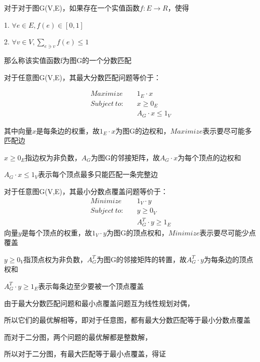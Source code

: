 \documentclass[UTF8]{ctexart}
\begin{document}
\begin{enumerate}
            \vspace{0.8cm}

            对于对于图G(V,E)，如果存在一个实值函数$f:E\to R$，使得

            1. $\forall e\in E,f(e)\in[0,1]$

            2. $\forall v\in V,\sum_{e\ni v}f(e)\le1$

            那么称该实值函数f为图G的一个分数匹配

            对于任意图G(V,E)，其最大分数匹配问题等价于：

            $$
                  \begin{aligned}
                        Maximize\quad     & 1_E\cdot x        \\
                        Subject\ to:\quad & x\ge0_E           \\
                                          & A_G\cdot x\le 1_V
                  \end{aligned}
            $$

            其中向量$x$是每条边的权重，故$1_E\cdot x$为图G的边权和，$Maximize$表示要尽可能多匹配边

            $x\ge0_E$指边权为非负数，$A_G$为图G的邻接矩阵，故$A_G\cdot x$为每个顶点的边权和

            $A_G\cdot x\le 1_V$表示每个顶点最多只能匹配一条完整边

            \vspace{0.8cm}

            对于任意图G(V,E)，其最小分数点覆盖问题等价于：
            $$
                  \begin{aligned}
                        Minimize\quad     & 1_V\cdot y          \\
                        Subject\ to:\quad & y\ge0_V             \\
                                          & A_G^T\cdot y\ge 1_E
                  \end{aligned}
            $$
            向量$y$是每个顶点的权重，故$1_V\cdot y$为图G的顶点权和，$Minimize$表示要尽可能少点覆盖

            $y\ge0_V$指顶点权为非负数，$A_G^T$为图G的邻接矩阵的转置，故$A_G^T\cdot y$为每条边的顶点权和

            $A_G^T\cdot y\ge 1_E$表示每条边至少要被一个顶点覆盖

            由于最大分数匹配问题和最小点覆盖问题互为线性规划对偶，

            所以它们的最优解相等，即对于任意图，都有最大分数匹配等于最小分数点覆盖

            而对于二分图，两个问题的最优解都是整数解，

            所以对于二分图，有最大匹配等于最小点覆盖，得证



\end{enumerate}
\end{document}
